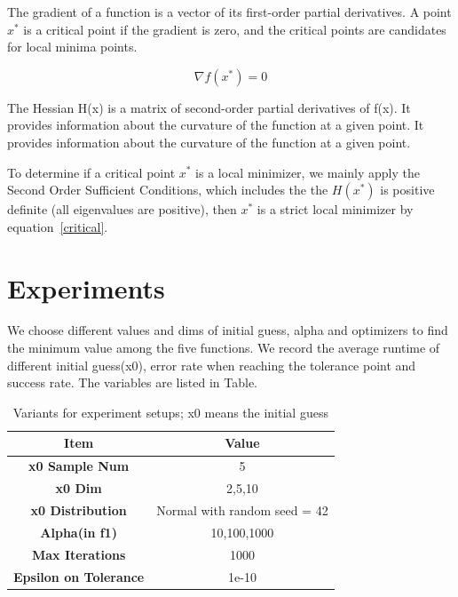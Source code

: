 \documentclass[12pt]{article}
\begin{document}
The gradient of a function is a vector of its first-order partial derivatives. A point $x^*$ is a critical point if the gradient is zero, and the critical points are candidates for local minima points.

\begin{equation}
\nabla f(x^*) = 0
\label{critical}
\end{equation}

The Hessian H(x) is a matrix of second-order partial derivatives of f(x). It provides information about the curvature of the function at a given point. It provides information about the curvature of the function at a given point.

To determine if a critical point $x^*$ is a local minimizer, we mainly apply the Second Order Sufficient Conditions, which includes the the $H(x^*)$ is positive definite (all eigenvalues are positive), then $x^*$ is a strict local minimizer by equation~\ref{critical}.






\section{Experiments}


We choose different values and dims of initial guess, alpha and optimizers to find the minimum value among the five functions. We record the average runtime of different initial guess(x0), error rate when reaching the tolerance point and success rate. The variables are listed in Table. %

\begin{table}[h!]
\label{table:rule}
\centering
\begin{tabular}{cc}
\toprule
 \textbf{Item} & \textbf{Value} \\ 
\midrule
\textbf{x0 Sample Num} & 5 \\
\textbf{x0 Dim} & {2,5,10} \\
\textbf{x0 Distribution} & Normal with random seed = 42 \\
\textbf{Alpha(in f1)} & {10,100,1000} \\
\textbf{Max Iterations} & 1000 \\
\textbf{Epsilon on Tolerance} & 1e-10 \\
\bottomrule
\end{tabular}
\caption{Variants for experiment setups; x0 means the initial guess}
\end{table}
\end{document}
